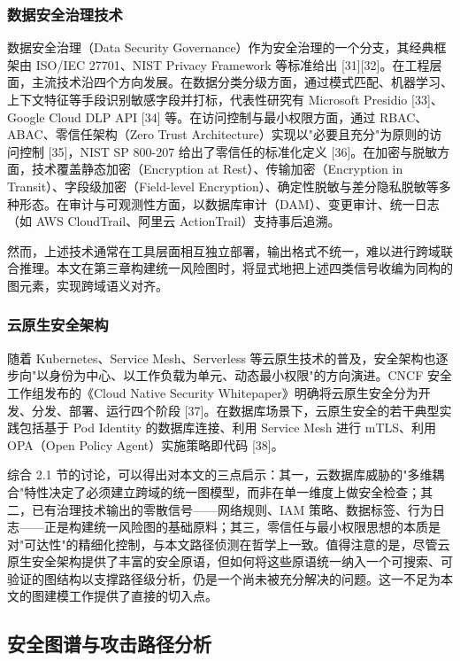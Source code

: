 \documentclass[a4paper,12pt]{ctexart}
\begin{document}
\subsubsection{数据安全治理技术}

数据安全治理（Data Security Governance）作为安全治理的一个分支，其经典框架由 ISO/IEC 27701、NIST Privacy Framework 等标准给出 [31][32]。在工程层面，主流技术沿四个方向发展。在数据分类分级方面，通过模式匹配、机器学习、上下文特征等手段识别敏感字段并打标，代表性研究有 Microsoft Presidio [33]、Google Cloud DLP API [34] 等。在访问控制与最小权限方面，通过 RBAC、ABAC、零信任架构（Zero Trust Architecture）实现以"必要且充分"为原则的访问控制 [35]，NIST SP 800-207 给出了零信任的标准化定义 [36]。在加密与脱敏方面，技术覆盖静态加密（Encryption at Rest）、传输加密（Encryption in Transit）、字段级加密（Field-level Encryption）、确定性脱敏与差分隐私脱敏等多种形态。在审计与可观测性方面，以数据库审计（DAM）、变更审计、统一日志（如 AWS CloudTrail、阿里云 ActionTrail）支持事后追溯。

然而，上述技术通常在工具层面相互独立部署，输出格式不统一，难以进行跨域联合推理。本文在第三章构建统一风险图时，将显式地把上述四类信号收编为同构的图元素，实现跨域语义对齐。

\subsubsection{云原生安全架构}

随着 Kubernetes、Service Mesh、Serverless 等云原生技术的普及，安全架构也逐步向"以身份为中心、以工作负载为单元、动态最小权限"的方向演进。CNCF 安全工作组发布的《Cloud Native Security Whitepaper》明确将云原生安全分为开发、分发、部署、运行四个阶段 [37]。在数据库场景下，云原生安全的若干典型实践包括基于 Pod Identity 的数据库连接、利用 Service Mesh 进行 mTLS、利用 OPA（Open Policy Agent）实施策略即代码 [38]。

综合 2.1 节的讨论，可以得出对本文的三点启示：其一，云数据库威胁的"多维耦合"特性决定了必须建立跨域的统一图模型，而非在单一维度上做安全检查；其二，已有治理技术输出的零散信号——网络规则、IAM 策略、数据标签、行为日志——正是构建统一风险图的基础原料；其三，零信任与最小权限思想的本质是对"可达性"的精细化控制，与本文路径侦测在哲学上一致。值得注意的是，尽管云原生安全架构提供了丰富的安全原语，但如何将这些原语统一纳入一个可搜索、可验证的图结构以支撑路径级分析，仍是一个尚未被充分解决的问题。这一不足为本文的图建模工作提供了直接的切入点。

\subsection{安全图谱与攻击路径分析}
\end{document}
